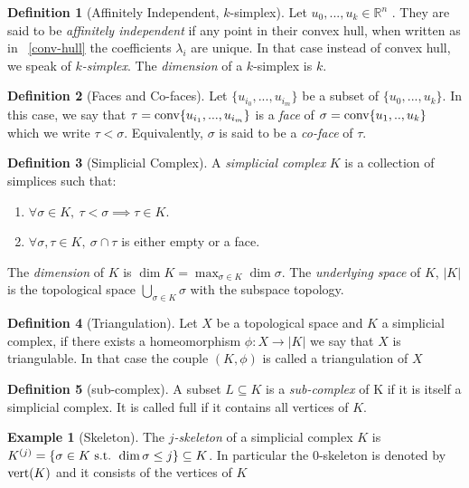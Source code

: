 \documentclass{article}
\newcommand{\R}{\mathbb{R}}
\newcommand{\conv}{\textmd{conv}}
\newcommand{\vertices}{\textmd{vert}}
\newcommand{\st}{\textmd{ s.t. }}
\theoremstyle{plain}
\theoremstyle{definition}
\newtheorem{definition}{Definition}[section]
\newtheorem{example}{Example}[section]
\theoremstyle{remark}
\begin{document}
	\begin{definition}[Affinitely Independent, $k$-simplex]
		Let $u_0,...,u_k \in \R^n$ . They are said to be \emph{affinitely independent }if any point in their convex hull, when written as in ~\eqref{conv-hull} the coefficients $\lambda_i$ are unique.
		In that case instead of convex hull, we speak of \emph{$k$-simplex}. The \emph{dimension} of a $k$-simplex is $k$.
	\end{definition}
	
	\begin{definition} [Faces and Co-faces]
		Let $ \{u_{i_0},...,u_{i_m} \}$ be a subset of $\{u_0,...,u_k\} $. In this case, we say that $ \tau = \conv\{u_{i_1},...,u_{i_m}\} $ is a \emph{face} of $ \sigma = \conv\{u_1,..,u_k\} $ which we write $ \tau < \sigma $. Equivalently, $ \sigma $ is said to be a \emph{co-face} of $ \tau $.
	\end{definition}
	
	\begin{definition}[Simplicial Complex]
		A \emph{simplicial complex} $K$ is a collection of simplices such that:
		\begin{enumerate}[label=(S\arabic*)]
			\item $ \forall \sigma \in K, \ \tau < \sigma \implies \tau \in K $. 
			\item $ \forall \sigma,\tau \in K, \ \sigma \cap \tau $ is either empty or a face.
		\end{enumerate}
	The \emph{dimension} of $K$ is $ \dim K = \max_{\sigma \in K} \dim \sigma $.
	The \emph{underlying space} of $K$, $|K|$ is the topological space $ \bigcup_{\sigma \in K} \sigma $ with the subspace topology.
	\end{definition}
\begin{definition}[Triangulation]
	Let $X$ be a topological space and $K$ a simplicial complex, if there exists a homeomorphism $ \phi : X \to |K| $ we say that $X$ is triangulable. In that case the couple $ (K,\phi) $ is called a triangulation of $X$
\end{definition}

	\begin{definition}[sub-complex]
		A subset $L \subseteq K$ is a \emph{sub-complex} of K if it is itself a simplicial complex. It is called full if it contains all vertices of $K$.
	\end{definition}
	
	\begin{example}[Skeleton]
		The \emph{$j$-skeleton} of a simplicial complex $K$ is $K^{(j)}= \{ \sigma \in K \st \dim\sigma \leq j \} \subseteq K $. In particular the 0-skeleton is denoted by $\vertices(K)$ and it consists of the vertices of $K$
	\end{example}
	
\end{document}
